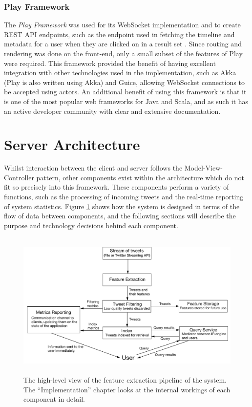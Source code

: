 \documentclass{l4proj}
\begin{document}
        \subsubsection{Play Framework}
        The \textit{Play Framework} was used for its WebSocket implementation and to create REST API endpoints, such as the endpoint used in fetching the timeline and metadata for a user when they are clicked on in a result set \cite{play}. Since routing and rendering was done on the front-end, only a small subset of the features of Play were required. This framework provided the benefit of having excellent integration with other technologies used in the implementation, such as Akka (Play is also written using Akka) and Guice, allowing WebSocket connections to be accepted using actors. An additional benefit of using this framework is that it is one of the most popular web frameworks for Java and Scala, and as such it has an active developer community with clear and extensive documentation.
    
    \section{Server Architecture}
    Whilst interaction between the client and server follows the Model-View-Controller pattern, other components exist within the architecture which do not fit so precisely into this framework. These components perform a variety of functions, such as the processing of incoming tweets and the real-time reporting of system statistics. Figure \ref{architecture} shows how the system is designed in terms of the flow of data between components, and the following sections will describe the purpose and technology decisions behind each component.
    
\begin{figure}[H]
\centering
\includegraphics[height=278px,width=496px]{architecture.pdf}
\caption{The high-level view of the feature extraction pipeline of the system. The ``Implementation'' chapter looks at the internal workings of each component in detail.}
\label{architecture}
\end{figure}
    
\end{document}
